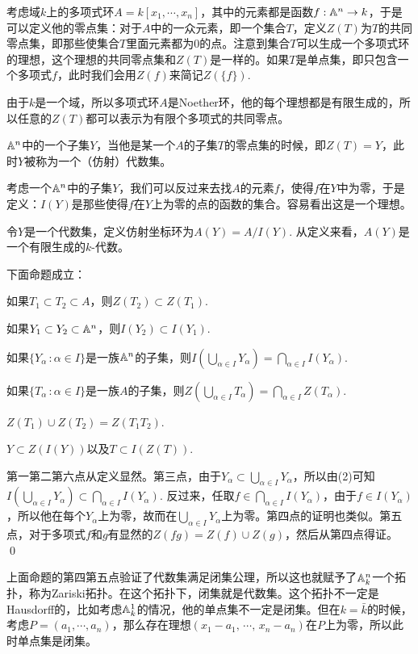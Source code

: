 考虑域$k$上的多项式环$A=k[x_1,\cdots ,x_n]$，其中的元素都是函数$f:\mathbb{A}^n\to k$，于是可以定义他的零点集：对于$A$中的一众元素，即一个集合$T$，定义$Z(T)$为$T$的共同零点集，即那些使集合$T$里面元素都为$0$的点。注意到集合$T$可以生成一个多项式环的理想，这个理想的共同零点集和$Z(T)$是一样的。如果$T$是单点集，即只包含一个多项式$f$，此时我们会用$Z(f)$来简记$Z(\{f\})$.

由于$k$是一个域，所以多项式环$A$是Noether环，他的每个理想都是有限生成的，所以任意的$Z(T)$都可以表示为有限个多项式的共同零点。

\para $\mathbb{A}^n$中的一个子集$Y$，当他是某一个$A$的子集$T$的零点集的时候，即$Z(T)=Y$，此时$Y$被称为一个（仿射）代数集。

考虑一个$\mathbb{A}^n$中的子集$Y$，我们可以反过来去找$A$的元素$f$，使得$f$在$Y$中为零，于是定义：$I(Y)$是那些使得$f$在$Y$上为零的点的函数的集合。容易看出这是一个理想。

\para 令$Y$是一个代数集，定义仿射坐标环为$A(Y)=A/I(Y)$. 从定义来看，$A(Y)$是一个有限生成的$k$-代数。

\pro 下面命题成立：

 如果$T_1\subset T_2 \subset A$，则$Z(T_2)\subset Z(T_1)$.

 如果$Y_1\subset Y_2 \subset \mathbb{A}^n$，则$I(Y_2)\subset I(Y_1)$.

 如果$\{Y_\alpha\,:\alpha\in I\}$是一族$\mathbb{A}^n$的子集，则$I\left(\bigcup_{\alpha\in I} Y_\alpha\right)=\bigcap_{\alpha\in I} I(Y_\alpha)$.

 如果$\{T_\alpha\,:\alpha\in I\}$是一族$A$的子集，则$Z\left(\bigcup_{\alpha\in I} T_\alpha\right)=\bigcap_{\alpha\in I} Z(T_\alpha)$.

 $Z(T_1)\cup Z(T_2)=Z(T_1T_2)$.

 $Y\subset Z(I(Y))$以及$T\subset I(Z(T))$.

\proof
	第一第二第六点从定义显然。第三点，由于$Y_\alpha\subset \bigcup_{\alpha\in I} Y_\alpha$，所以由(2)可知$I\left(\bigcup_{\alpha\in I} Y_\alpha\right)\subset\bigcap_{\alpha\in I} I(Y_\alpha)$. 反过来，任取$f\in \bigcap_{\alpha\in I} I(Y_\alpha)$，由于$f\in I(Y_\alpha)$，所以他在每个$Y_\alpha$上为零，故而在$\bigcup_{\alpha\in I} Y_\alpha$上为零。第四点的证明也类似。第五点，对于多项式$f$和$g$有显然的$Z(fg)=Z(f)\cup Z(g)$，然后从第四点得证。
\qed

上面命题的第四第五点验证了代数集满足闭集公理，所以这也就赋予了$\mathbb{A}^n_k$一个拓扑，称为Zariski拓扑。在这个拓扑下，闭集就是代数集。这个拓扑不一定是Hausdorff的，比如考虑$\mathbb{A}^1_k$的情况，他的单点集不一定是闭集。但在$k=\bar{k}$的时候，考虑$P=(a_1,\cdots ,a_n)$，那么存在理想$(x_1-a_1,\,\cdots\!,\,x_n-a_n)$在$P$上为零，所以此时单点集是闭集。

